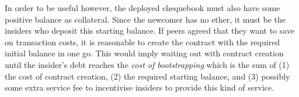 In order to be useful however, the deployed chequebook must also have some positive balance as collateral. Since the newcomer has no ether, it must be the insiders who deposit this starting balance. If peers agreed that they want to save on transaction costs, it is reasonable to create the contract with the required initial balance in one go. This would imply waiting out with contract creation until the insider's debt reaches the \emph{cost of bootstrapping} which is the sum of (1) the cost of contract creation, (2) the required starting balance, and (3) possibly some extra service fee to incentivise insiders to provide this kind of service.
% 
% 
% 
% 


